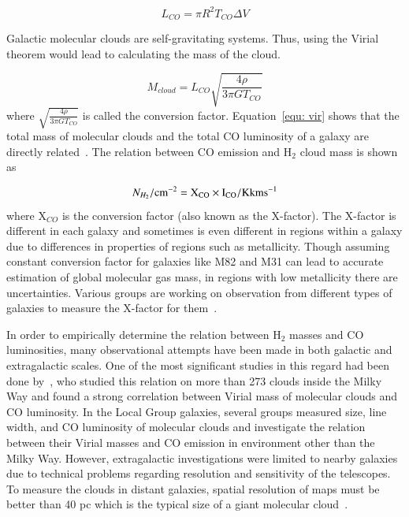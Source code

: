  \begin{equation}
L_{CO} = \pi R^2 T_{CO} \Delta V
\end{equation}

Galactic molecular clouds are self-gravitating systems.
Thus, using the Virial theorem would lead to calculating the mass of the cloud.

 \begin{equation}
 \label{equ: vir}
 M_{cloud} = L_{CO} \sqrt{\frac{4\rho}{3\pi G T_{CO}}}
 \end{equation}
 where $\sqrt{\frac{4\rho}{3\pi G T_{CO}}}$ is called the conversion factor. 
 Equation~\ref{equ: vir} shows that the total mass of molecular clouds and the total CO luminosity of a galaxy are directly related~\citep{Young91}. 
 The relation between CO emission and H$_2$ cloud mass is shown as

\begin{equation}
N_{H_2}/\rm cm^{-2} = X_{CO} \times I_{CO}/\rm K km s^{-1}
\end{equation}
where X$_{CO}$ is the conversion factor (also known as the X-factor).
The X-factor is different in each galaxy and sometimes is even different in regions within a galaxy due to differences in properties of regions such as metallicity. 
Though assuming constant conversion factor for galaxies like M82 and M31 can lead to accurate estimation of global molecular gas mass, in regions with low metallicity there are uncertainties. 
Various groups are working on observation from different types of galaxies to measure the X-factor for them~\citep{Wilson95, Bosselli02, Bolato13}.

In order to empirically determine the relation between H$_2$ masses and CO luminosities, many observational attempts have been made in both galactic and extragalactic scales. 
One of the most significant studies in this regard had been done by~\cite{Solomon87}, who studied this relation on more than 273 clouds inside the Milky Way and found a strong correlation between Virial mass of molecular clouds and CO luminosity. 
In the Local Group galaxies, several groups measured size, line width, and CO luminosity of molecular clouds and investigate the relation between  their Virial masses and CO emission in environment other than the Milky Way. However, extragalactic investigations were limited to nearby galaxies due to technical problems regarding resolution and sensitivity of the telescopes. 
To measure the clouds in distant galaxies, spatial resolution of maps must be better than 40 pc which is the typical size of a giant molecular cloud~\citep[e.g.][and refrences therein]{Bolato13}. 

